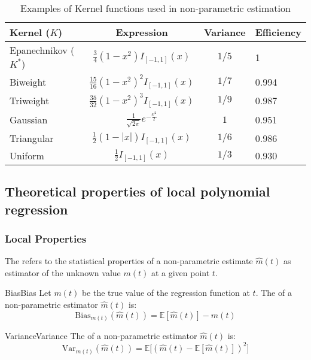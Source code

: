 \begin{table}[H]
	\caption{Examples of Kernel functions used in non-parametric estimation}
	\begin{tabular}{lccl}
		\toprule
		Kernel ($K$)         & Expression                                & Variance & Efficiency \\
		\midrule
		Epanechnikov ($K^*$) & $\frac{3}{4}(1-x^2)I_{[-1,1]}(x)$         & $1/5$    & 1          \\
		Biweight             & $\frac{15}{16}(1-x^2)^2I_{[-1,1]}(x)$     & $1/7$    & 0.994      \\
		Triweight            & $\frac{35}{32}(1-x^2)^3I_{[-1,1]}(x)$     & $1/9$    & 0.987      \\
		Gaussian             & $\frac{1}{\sqrt{2\pi}}e^{-\frac{x^2}{2}}$ & $1$      & 0.951      \\
		Triangular           & $\frac{1}{2}(1-|x|)I_{[-1,1]}(x)$         & $1/6$    & 0.986      \\
		Uniform              & $\frac{1}{2}I_{[-1,1]}(x)$                & $1/3$    & 0.930      \\
		\bottomrule
	\end{tabular}
\end{table}

\subsection{Theoretical properties of local polynomial regression}

\subsubsection{Local Properties}

The  refers to the statistical properties of
a non-parametric estimate $\hat m(t)$ as estimator of the unknown
value $m(t)$ at a given point $t$.

\begin{definition}{Bias}{Bias}
	Let $m(t)$ be the true value of the regression function at $t$.
	The  of a non-parametric estimator $\hat m(t)$ is:
	\begin{equation*}
		\text{Bias}_{m(t)}(\hat m(t)) = \mathbb E[\hat m(t)] - m(t)
	\end{equation*}
\end{definition}

\begin{definition}{Variance}{Variance}
	The  of a non-parametric estimator $\hat m(t)$ is:
	\begin{equation*}
		\text{Var}_{m(t)}(\hat m(t)) = \mathbb E\bigl[(\hat m(t) - \mathbb E[\hat m(t)])^2\bigr]
	\end{equation*}
\end{definition}

